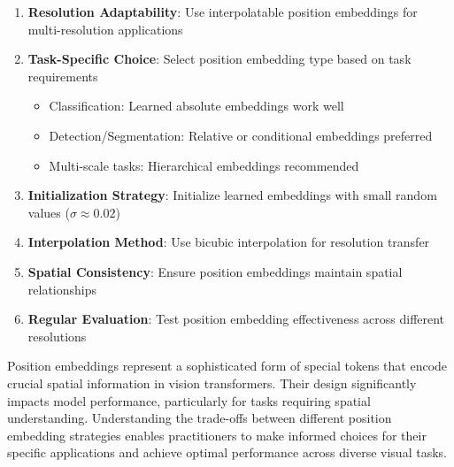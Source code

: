 \begin{enumerate}
\item \textbf{Resolution Adaptability}: Use interpolatable position embeddings for multi-resolution applications
\item \textbf{Task-Specific Choice}: Select position embedding type based on task requirements
    \begin{itemize}
    \item Classification: Learned absolute embeddings work well
    \item Detection/Segmentation: Relative or conditional embeddings preferred
    \item Multi-scale tasks: Hierarchical embeddings recommended
    \end{itemize}
\item \textbf{Initialization Strategy}: Initialize learned embeddings with small random values ($\sigma \approx 0.02$)
\item \textbf{Interpolation Method}: Use bicubic interpolation for resolution transfer
\item \textbf{Spatial Consistency}: Ensure position embeddings maintain spatial relationships
\item \textbf{Regular Evaluation}: Test position embedding effectiveness across different resolutions
\end{enumerate}

Position embeddings represent a sophisticated form of special tokens that encode crucial spatial information in vision transformers. Their design significantly impacts model performance, particularly for tasks requiring spatial understanding. Understanding the trade-offs between different position embedding strategies enables practitioners to make informed choices for their specific applications and achieve optimal performance across diverse visual tasks.